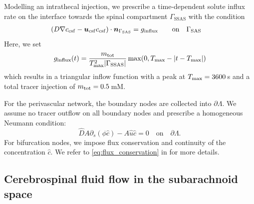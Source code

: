 \documentclass[fleqn,10pt]{wlscirep}
\newcommand{\spinal}{\Gamma_{\rm SAS}}
\begin{document}
Modelling an intrathecal injection, we prescribe a time-dependent solute influx rate on the interface towards the spinal compartment $\Gamma_{\mathrm{SSAS}}$
with the condition 
\begin{alignat}{2}
    (D \nabla  c_{\mathrm{csf}} - \bm u_{\mathrm{csf}}c_{\mathrm{csf}} ) \cdot \bm{n}_{\spinal} & = g_{\mathrm{influx}} &&   \quad  \mathrm{on} \quad \spinal  \end{alignat}
Here, we set
\begin{equation}
g_\mathrm{influx}(t) = \frac{m_{\rm tot}}{T_{\rm max}^2 |\Gamma_{\rm SSAS}|} \max(0, T_{\rm max} - |t - T_{\rm max}|)
\end{equation}
which results in a triangular inflow function with a peak at $T_{\rm max} = 3600\,$s and a total tracer injection of $m_{\rm tot} = 0.5$\,mM.

For the perivascular network, the boundary nodes are collected into $\partial \Lambda$. We assume no tracer outflow on all boundary nodes and prescribe a homogeneous Neumann condition: 
\begin{equation}
    \hat D A \partial_s (\phi \hat c) - A \hat u \hat c  = 0 \quad \mathrm{on} \quad \partial \Lambda. 
\end{equation}
For bifurcation nodes, we impose flux conservation and continuity of the concentration $\hat c$. We refer to \eqref{eq:flux_conservation} in  for more details. 

\subsection{Cerebrospinal fluid flow in the subarachnoid space} \label{sec:csf_fluid_vel}
\end{document}
